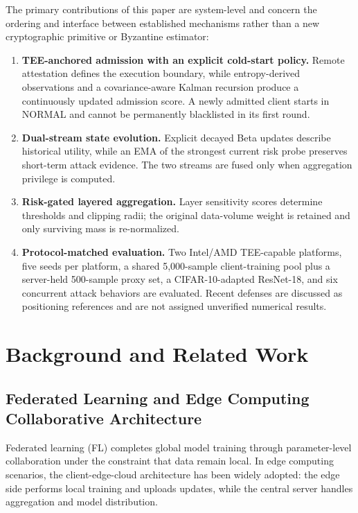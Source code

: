 \documentclass[final,5p,times,twocolumn]{elsarticle/elsarticle}
\begin{document}
The primary contributions of this paper are system-level and concern the
ordering and interface between established mechanisms rather than a new
cryptographic primitive or Byzantine estimator:
\begin{enumerate}
    \item \textbf{TEE-anchored admission with an explicit cold-start policy.} Remote attestation defines the execution boundary, while entropy-derived observations and a covariance-aware Kalman recursion produce a continuously updated admission score. A newly admitted client starts in NORMAL and cannot be permanently blacklisted in its first round.
    \item \textbf{Dual-stream state evolution.} Explicit decayed Beta updates describe historical utility, while an EMA of the strongest current risk probe preserves short-term attack evidence. The two streams are fused only when aggregation privilege is computed.
    \item \textbf{Risk-gated layered aggregation.} Layer sensitivity scores determine thresholds and clipping radii; the original data-volume weight is retained and only surviving mass is re-normalized.
    \item \textbf{Protocol-matched evaluation.} Two Intel/AMD TEE-capable platforms, five seeds per platform, a shared 5,000-sample client-training pool plus a server-held 500-sample proxy set, a CIFAR-10-adapted ResNet-18, and six concurrent attack behaviors are evaluated. Recent defenses are discussed as positioning references and are not assigned unverified numerical results.
\end{enumerate}

\section{Background and Related Work}

\subsection{Federated Learning and Edge Computing Collaborative Architecture}
Federated learning (FL) completes global model training through parameter-level collaboration under the constraint that data remain local. In edge computing scenarios, the client-edge-cloud architecture has been widely adopted: the edge side performs local training and uploads updates, while the central server handles aggregation and model distribution.
\end{document}
